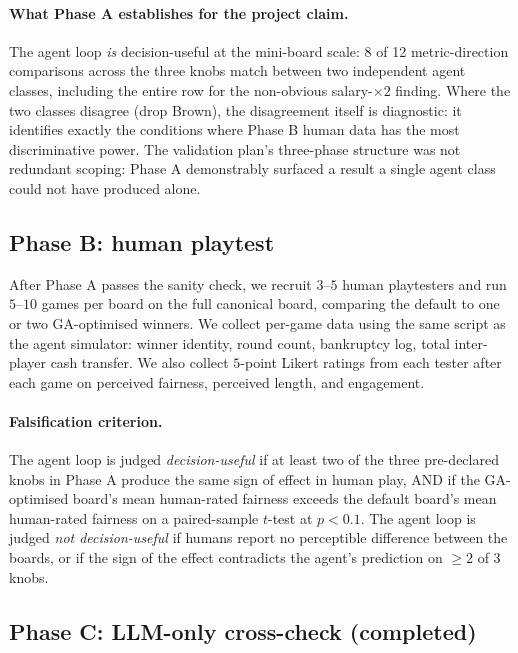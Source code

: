 \documentclass[10pt]{article}
\begin{document}
\paragraph{What Phase A establishes for the project claim.} The agent
loop \emph{is} decision-useful at the mini-board scale: 8 of 12
metric-direction comparisons across the three knobs match between two
independent agent classes, including the entire row for the
non-obvious salary-$\times 2$ finding. Where the two classes disagree
(drop Brown), the disagreement itself is diagnostic: it identifies
exactly the conditions where Phase B human data has the most
discriminative power. The validation plan's three-phase structure was
not redundant scoping: Phase A demonstrably surfaced a result a single
agent class could not have produced alone.

\subsection{Phase B: human playtest}

After Phase A passes the sanity check, we recruit $3$--$5$ human
playtesters and run $5$--$10$ games per board on the full canonical
board, comparing the default to one or two GA-optimised winners. We
collect per-game data using the same script as the agent simulator:
winner identity, round count, bankruptcy log, total inter-player cash
transfer. We also collect $5$-point Likert ratings from each tester
after each game on perceived fairness, perceived length, and engagement.

\paragraph{Falsification criterion.} The agent loop is judged
\emph{decision-useful} if at least two of the three pre-declared knobs
in Phase A produce the same sign of effect in human play, AND if the
GA-optimised board's mean human-rated fairness exceeds the default
board's mean human-rated fairness on a paired-sample $t$-test at
$p<0.1$. The agent loop is judged \emph{not decision-useful} if humans
report no perceptible difference between the boards, or if the sign of
the effect contradicts the agent's prediction on $\geq 2$ of $3$ knobs.

\subsection{Phase C: LLM-only cross-check (completed)}\label{sec:phase_c}
\end{document}
